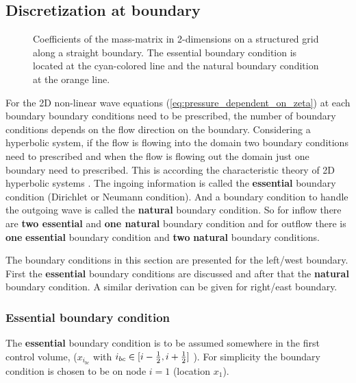 \subsection{Discretization at boundary}
\begin{figure}[H]
    \begin{center}
        \def\svgwidth{0.80\textwidth} %
        \resizebox{0.65\textwidth}{!}{
            
        }
    \end{center}
    \caption[Definition of the grid to solve the 2D-shallow water equations at the boundary]{Coefficients of the mass-matrix in 2-dimensions on a structured grid along a straight boundary. The essential boundary condition is located at the cyan-colored line and the natural boundary condition at the orange line.}
    \label{fig:structured_grid_along_straight_boundary}
\end{figure}
For the 2D non-linear wave equations (\autoref{eq:pressure_dependent_on_zeta}) at each boundary boundary conditions need to be prescribed, the number of boundary conditions depends on the flow direction on the boundary.
Considering a hyperbolic system, if the flow is flowing into the domain two boundary conditions need to prescribed and when the flow is flowing out the domain just one boundary need to prescribed.
This is according the characteristic theory of 2D hyperbolic systems \citep{DaubertEtGraffe1967}.
The ingoing information is called the \textbf{essential} boundary condition (Dirichlet or Neumann condition).
And a boundary condition to handle the outgoing wave is called the \textbf{natural} boundary condition.
So for inflow there are \textbf{two essential} and \textbf{one natural} boundary condition and for outflow there is \textbf{one} \textbf{essential} boundary condition and \textbf{two} \textbf{natural} boundary conditions.

The boundary conditions in this section are presented for the left/west boundary.
First the \textbf{essential} boundary conditions are discussed and after that the \textbf{natural} boundary condition.
A similar derivation can be given for right/east boundary.

\subsubsection{Essential boundary condition}
The \textbf{essential} boundary condition is to be assumed somewhere in the first control volume, ($x_{i_{bc}}$ with $i_{bc} \in [i-\frac{1}{2}, i+\frac{1}{2}]$ ).
For simplicity the boundary condition is chosen to be on node $i=1$ (location $x_{1}$).

